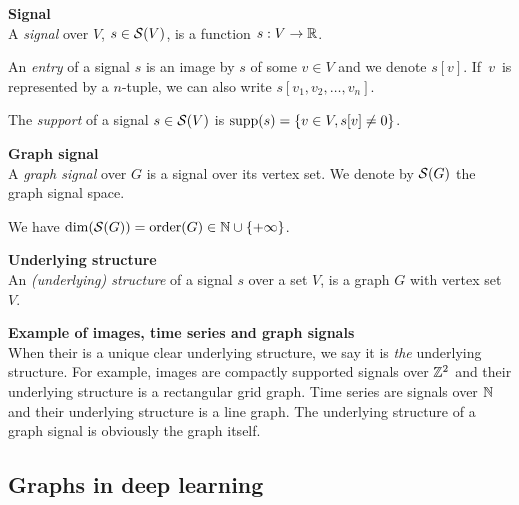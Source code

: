 \begin{definition}\textbf{Signal}\\
A \emph{signal} over $V$, $s \in \mathcal{S}(V)$, is a function $s: V \rightarrow \mathbb{R}$.

An \emph{entry} of a signal $s$ is an image by $s$ of some $v \in V$ and we denote $s[v]$. If~$v$~is represented by a $n$-tuple, we can also write $s[v_1, v_2, \ldots, v_n]$.

The \emph{support} of a signal $s \in \mathcal{S}(V)$ is $\operatorname{supp}(s) = \{ v \in V, s[v] \neq 0 \}$.
\end{definition}

\begin{definition}\textbf{Graph signal}\\ 
A \emph{graph signal} over $G$ is a signal over its vertex set. We denote by $\mathcal{S}(G)$ the graph signal space.
\end{definition}

We have $\dim(\mathcal{S}(G)) = \operatorname{order}(G) \in \mathbb{N} \cup \{+\infty\}$.

\begin{definition}\textbf{Underlying structure}\\
An \emph{(underlying) structure} of a signal $s$ over a set $V$, is a graph $G$ with vertex set $V$.
\end{definition}

\begin{remark}\textbf{Example of images, time series and graph signals}\\
When their is a unique clear underlying structure, we say it is \emph{the} underlying structure. For example, images are compactly supported signals over $\mathbb{Z}^2$ and their underlying structure is a rectangular grid graph. Time series are signals over $\mathbb{N}$ and their underlying structure is a line graph. The underlying structure of a graph signal is obviously the graph itself.
\end{remark}

\subsection{Graphs in deep learning}


